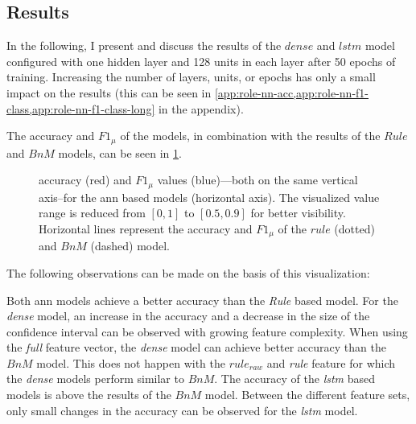 \subsection{Results}

In the following, I present and discuss the results of the \(dense\) and \(lstm\) model configured with one hidden layer and 128 units in each layer after 50 epochs of training.
Increasing the number of layers, units, or epochs has only a small impact on the results (this can be seen in \cref{app:role-nn-acc,app:role-nn-f1-class,app:role-nn-f1-class-long} in the appendix).

The \gls{accuracy} and \(F1_\mu\) of the models, in combination with the results of the \(Rule\) and \(BnM\) models, can be seen in \cref{fig:role-nn-acc}.
\begin{figure}[htbp]
    \centering
    \begin{footnotesize}
    
    \end{footnotesize}
    \caption[Overall performance of neural network models.]{\label{fig:role-nn-acc} 
    \Gls{accuracy} (red) and \(F1_\mu\) values (blue)---both on the same vertical axis--for the \gls{ann} based models (horizontal axis).
    The visualized value range is reduced from \([0,1]\) to \([0.5,0.9]\) for better visibility.
    Horizontal lines represent the \gls{accuracy} and \(F1_\mu\) of the \(rule\) (dotted) and \(BnM\) (dashed) model.
    }
\end{figure}
The following observations can be made on the basis of this visualization:

Both \gls{ann} models achieve a better \gls{accuracy} than the \emph{Rule} based mo\-del.
For the \emph{dense} model, an increase in the \gls{accuracy} and a decrease in the size of the confidence interval can be observed with growing feature complexity.
When using the \emph{full} feature vector, the \emph{dense} model can achieve better \gls{accuracy} than the \(BnM\) model. 
This does not happen with the \(rule_{raw}\) and \emph{rule} feature for which the \emph{dense} models perform similar to \(BnM\).
The \gls{accuracy} of the \emph{lstm} based models is above the results of the \(BnM\) model.
Between the different feature sets, only small changes in the \gls{accuracy} can be observed for the \emph{lstm} model.

